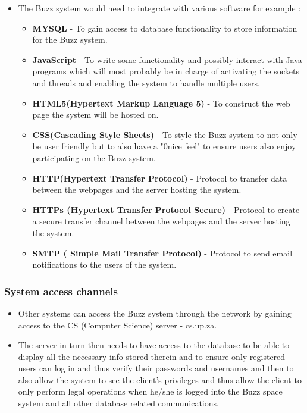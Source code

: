\documentclass[a4paper]{article}
\begin{document}
\begin{itemize}
\item The Buzz system would need to integrate with various software for example :
\begin{itemize}
\item \textbf{MYSQL} - To gain access to database functionality to store information for the Buzz system.
\item \textbf{JavaScript} - To write some functionality and possibly interact with Java programs which will most probably be in charge of activating the sockets and threads and enabling the system to handle multiple users.
\item\textbf{ HTML5(Hypertext Markup Language 5)} - To construct the web page the system will be hosted on.
\item \textbf{CSS(Cascading Style Sheets)} - To style the Buzz system to not only be user friendly but to also have a "0nice feel" to ensure users also enjoy participating on the Buzz system.
\item \textbf{HTTP(Hypertext Transfer Protocol)} - Protocol to transfer data between the webpages and the server hosting the system.
\item \textbf{HTTPs (Hypertext Transfer Protocol Secure)} - Protocol to create a secure transfer channel between the webpages and the server hosting the system.
\item \textbf{SMTP ( Simple Mail Transfer Protocol)} - Protocol to send email notifications to the users of the system. 
\end{itemize}
\end{itemize}

\subsubsection{System access channels }

\begin{itemize}
\item Other systems can access the Buzz system through the network by gaining access to the  CS (Computer Science) server - cs.up.za. 
\item The server in turn then needs to have access to the database to be able to display all the necessary info stored therein and to ensure only registered users can log in and thus verify their passwords and usernames and then to also allow the system to see the client's privileges and thus allow the client to only perform legal operations when he/she is logged into the Buzz space system and all other database related communications. 
\end{itemize}
\end{document}
